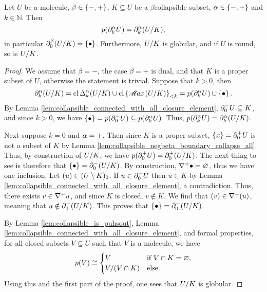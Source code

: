 \begin{lem} \label{lem:collapsible_mapcoll_preserve_boundaries}
    Let \( U \) be a molecule, \( \beta \in \set{-, +} \), \( K \subseteq U \) be a \( \beta \)\nbd collapsible subset, \( \a \in \set{-, +} \) and \( k \in \mathbb{N} \).
    Then 
    \begin{equation*}
        \mapcoll (\bd{k}{\a} U) = \bd{k}{\a} (\coll{K}{U}),
    \end{equation*}
    in particular \( \bd{0}{\beta} (\coll{K}{U}) = \set{\zcoll} \).
    Furthermore, \( \coll{K}{U} \) is globular, and if \( U \) is round, so is \( \coll{K}{U} \).
\end{lem}
\begin{proof}
    We assume that \( \beta = - \), the case \( \beta = + \) is dual, and that \( K \) is a proper subset of \( U \), otherwise the statement is trivial.
    Suppose that \( k > 0 \), then
    \begin{equation*}
        \bd{k}{\a} (\coll{K}{U}) = \clos \faces{k}{\a} (\coll{K}{U}) \cup \gr{< k}{\clset{\maxel (\coll{K}{U})}} = \mapcoll(\bd{k}{\a} U) \cup \set{\zcoll}.
    \end{equation*}
    By Lemma \ref{lem:collapsible_connected_with_all_closure_element}, \( \bd{0}{-} U \subseteq K \), and since \( k > 0 \), we have \( \set{\zcoll} = p(\bd{0}{-} U) \subseteq p(\bd{k}{\a} U) \).
    Thus, \(  \mapcoll (\bd{k}{\a} U) = \bd{k}{\a} (\coll{K}{U}) \).

    Next suppose \( k = 0 \) and \( \a = + \).
    Then since \( K \) is a proper subset, \( \set{x} = \bd{0}{+} U \) is not a subset of \( K \) by Lemma \ref{lem:collapsible_negbeta_boundary_collapse_all}. 
    Thus, by construction of \( \coll{K}{U} \), we have \( \mapcoll (\bd{0}{+} U) = \bd{0}{+} (\coll{K}{U}) \).
    The next thing to see is therefore that \( \set{\zcoll} = \bd{0}{-} (\coll{K}{U}) \).
    By construction, \( \cofaces{}{+} \zcoll = \varnothing \), thus we have one inclusion.
    Let \( \icoll{u} \in \gr{0}{(U \setminus K)} \).
    If \( u \in \bd{0}{-} U \) then \( u \in K \) by Lemma \ref{lem:collapsible_connected_with_all_closure_element}, a contradiction.
    Thus, there exists \( v \in \cofaces{}{+} u \), and since \( K \) is closed, \( v \notin K \).
    We find that \( \icoll{v} \in \cofaces{}{+} \icoll{u} \), meaning that \( u \notin \bd{0}{-} (\coll{K}{U}) \).
    This proves that \( \set{\zcoll} = \bd{0}{-} (\coll{K}{U}) \).

    By Lemma \ref{lem:collapsible_is_puhsout}, Lemma \ref{lem:collapsible_connected_with_all_closure_element}, and formal properties, for all closed subsets \( V \subseteq U \) such that \( V \) is a molecule, we have 
    \begin{equation*}
        p(V) \cong
        \begin{cases}
            V & \text{if } V \cap K = \varnothing, \\
            \coll{(V \cap K)}{V} & \text{else}.
        \end{cases}
    \end{equation*}
    Using this and the first part of the proof, one sees that \( \coll{K}{U} \) is globular.


\end{proof}
